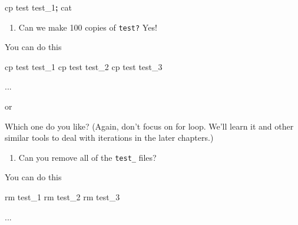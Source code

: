 \documentclass[
]{book}
\newenvironment{Shaded}{\begin{snugshade}}{\end{snugshade}}
\newcommand{\DataTypeTok}[1]{\textcolor[rgb]{0.13,0.29,0.53}{#1}}
\newcommand{\ExtensionTok}[1]{#1}
\newcommand{\FunctionTok}[1]{\textcolor[rgb]{0.00,0.00,0.00}{#1}}
\newcommand{\KeywordTok}[1]{\textcolor[rgb]{0.13,0.29,0.53}{\textbf{#1}}}
\newcommand{\NormalTok}[1]{#1}
\newcommand{\StringTok}[1]{\textcolor[rgb]{0.31,0.60,0.02}{#1}}
\newcommand{\VariableTok}[1]{\textcolor[rgb]{0.00,0.00,0.00}{#1}}
\providecommand{\tightlist}{%
  \setlength{\itemsep}{0pt}\setlength{\parskip}{0pt}}
\begin{document}
\begin{Shaded}
\begin{Highlighting}[]

\FunctionTok{cp}\NormalTok{ test test\_1}\KeywordTok{;} \FunctionTok{cat} 
\end{Highlighting}
\end{Shaded}

\begin{enumerate}
\def\labelenumi{\arabic{enumi}.}
\setcounter{enumi}{1}
\tightlist
\item
  Can we make 100 copies of \texttt{test?} Yes!
\end{enumerate}

You can do this

\begin{Shaded}
\begin{Highlighting}[]

\FunctionTok{cp}\NormalTok{ test test\_1 }
\FunctionTok{cp}\NormalTok{ test test\_2}
\FunctionTok{cp}\NormalTok{ test test\_3 }

\ExtensionTok{...} 
\end{Highlighting}
\end{Shaded}

or

\begin{Shaded}
\end{Shaded}

Which one do you like? (Again, don't focus on for loop. We'll learn it and other similar tools to deal with iterations in the later chapters.)

\begin{enumerate}
\def\labelenumi{\arabic{enumi}.}
\setcounter{enumi}{2}
\tightlist
\item
  Can you remove all of the \texttt{test\_} files?
\end{enumerate}

You can do this

\begin{Shaded}
\begin{Highlighting}[]
\FunctionTok{rm}\NormalTok{ test\_1}
\FunctionTok{rm}\NormalTok{ test\_2}
\FunctionTok{rm}\NormalTok{ test\_3 }

\ExtensionTok{...}
\end{Highlighting}
\end{Shaded}
\end{document}
